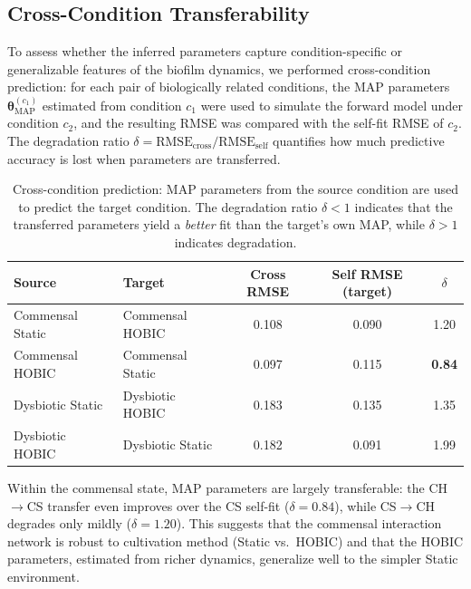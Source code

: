 \documentclass[11pt,a4paper]{article}
\begin{document}
\subsection{Cross-Condition Transferability}
\label{sec:cross_condition}

To assess whether the inferred parameters capture condition-specific or generalizable features of the biofilm dynamics, we performed cross-condition prediction: for each pair of biologically related conditions, the MAP parameters $\boldsymbol{\theta}^{(c_1)}_{\text{MAP}}$ estimated from condition $c_1$ were used to simulate the forward model under condition $c_2$, and the resulting RMSE was compared with the self-fit RMSE of $c_2$. The degradation ratio $\delta = \text{RMSE}_{\text{cross}} / \text{RMSE}_{\text{self}}$ quantifies how much predictive accuracy is lost when parameters are transferred.

\begin{table}[H]
\centering
\caption{Cross-condition prediction: MAP parameters from the source condition are used to predict the target condition. The degradation ratio $\delta < 1$ indicates that the transferred parameters yield a \emph{better} fit than the target's own MAP, while $\delta > 1$ indicates degradation.}
\begin{tabular}{l l c c c}
\toprule
Source & Target & Cross RMSE & Self RMSE (target) & $\delta$ \\
\midrule
Commensal Static  & Commensal HOBIC  & 0.108 & 0.090 & 1.20 \\
Commensal HOBIC   & Commensal Static & 0.097 & 0.115 & \textbf{0.84} \\
Dysbiotic Static  & Dysbiotic HOBIC  & 0.183 & 0.135 & 1.35 \\
Dysbiotic HOBIC   & Dysbiotic Static & 0.182 & 0.091 & 1.99 \\
\bottomrule
\end{tabular}
\label{tab:cross_condition}
\end{table}

Within the commensal state, MAP parameters are largely transferable: the CH$\to$CS transfer even improves over the CS self-fit ($\delta = 0.84$), while CS$\to$CH degrades only mildly ($\delta = 1.20$). This suggests that the commensal interaction network is robust to cultivation method (Static vs.\ HOBIC) and that the HOBIC parameters, estimated from richer dynamics, generalize well to the simpler Static environment.
\end{document}
